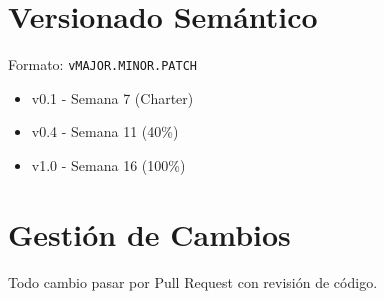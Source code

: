 \section{Versionado Semántico}

Formato: \texttt{vMAJOR.MINOR.PATCH}

\begin{itemize}
    \item v0.1 - Semana 7 (Charter)
    \item v0.4 - Semana 11 (40\%)
    \item v1.0 - Semana 16 (100\%)
\end{itemize}

\section{Gestión de Cambios}

Todo cambio  pasar por Pull Request con revisión de código.

\printbibliography[heading=bibintoc,title={Referencias}]



